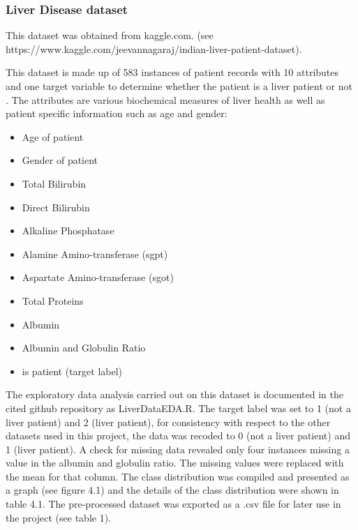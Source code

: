 \subsubsection{Liver Disease dataset}
This dataset was obtained from kaggle.com.\newline
(see https://www.kaggle.com/jeevannagaraj/indian-liver-patient-dataset). \newline

This dataset is made up of 583 instances of patient records with 10 attributes and one target variable to determine whether the patient is a liver patient or not \citep{Ramana:2011tn}. The attributes are various biochemical measures of liver health as well as patient specific information such as age and gender:
\begin{itemize}
    \item Age of patient
    \item Gender of patient
    \item Total Bilirubin
    \item Direct Bilirubin
    \item Alkaline Phosphatase
    \item Alamine Amino-transferase (sgpt)
    \item Aspartate Amino-transferase (sgot)
    \item Total Proteins
    \item Albumin
    \item Albumin and Globulin Ratio
    \item is patient (target label)
\end{itemize}

The exploratory data analysis carried out on this dataset is documented in the cited github repository as LiverDataEDA.R.\newline
The target label was set to 1 (not a liver patient) and 2 (liver patient), for consistency with respect to the other datasets used in this project, the data was recoded to 0 (not a liver patient) and 1 (liver patient).\newline
A check for missing data revealed only four instances missing a value in the albumin and globulin ratio. The missing values were replaced with the mean for that column.\newline
The class distribution was compiled and presented as a graph (see figure 4.1) and the details of the class distribution were shown in table 4.1.\newline
The pre-processed dataset was exported as a .csv file for later use in the project (see table 1).\newline

